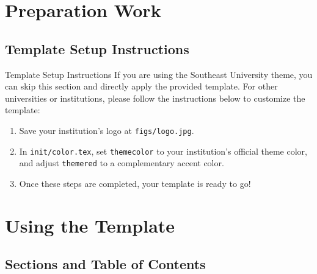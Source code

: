 \documentclass[8pt]{beamer}
\begin{document}
\section{Preparation Work}

\makesection

\subsection{Template Setup Instructions}

\begin{frame}{\insertsection}{\insertsubsection}
    \begin{block}{Template Setup Instructions}
        If you are using the Southeast University theme, you can skip this section and directly apply the provided template. For other universities or institutions, please follow the instructions below to customize the template:
        \begin{enumerate}
            \item Save your institution’s logo at \lstinline|figs/logo.jpg|.
            \item In \lstinline|init/color.tex|, set \lstinline|themecolor| to your institution’s official theme color, and adjust \lstinline|themered| to a complementary accent color.
            \item Once these steps are completed, your template is ready to go!
        \end{enumerate}
    \end{block}
\end{frame}

\section{Using the Template}

\makesection

\subsection{Sections and Table of Contents}
\end{document}
